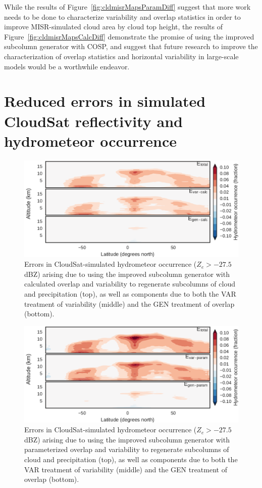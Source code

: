 While the results of Figure~\ref{fig:cldmisrMapsParamDiff} suggest that
more work needs to be done to characterize variability and overlap
statistics in order to improve MISR-simulated cloud area by cloud top
height, the results of Figure~\ref{fig:cldmisrMapsCalcDiff} demonstrate
the promise of using the improved subcolumn generator with COSP, and
suggest that future research to improve the characterization of overlap
statistics and horizontal variability in large-scale models would be a
worthwhile endeavor.

\section{Reduced errors in simulated CloudSat reflectivity and
hydrometeor occurrence}\label{sec:subgrid2Active}

\begin{figure}[htbp]
\centering
\includegraphics{graphics/subgrid2_hfba_zonal_gen-var-calc_diff.pdf}
\caption{\label{fig:hfbaZonalCalcDiff}Errors in CloudSat-simulated
hydrometeor occurrence (\(Z_e > -27.5\) dBZ) arising due to using the
improved subcolumn generator with calculated overlap and variability to
regenerate subcolumns of cloud and precipitation (top), as well as
components due to both the VAR treatment of variability (middle) and the
GEN treatment of overlap (bottom).}\label{fig:hfbaZonalCalcDiff}
\end{figure}

\begin{figure}[htbp]
\centering
\includegraphics{graphics/subgrid2_hfba_zonal_gen-var-param_diff.pdf}
\caption{\label{fig:hfbaZonalParamDiff}Errors in CloudSat-simulated
hydrometeor occurrence (\(Z_e > -27.5\) dBZ) arising due to using the
improved subcolumn generator with parameterized overlap and variability
to regenerate subcolumns of cloud and precipitation (top), as well as
components due to both the VAR treatment of variability (middle) and the
GEN treatment of overlap (bottom).}\label{fig:hfbaZonalParamDiff}
\end{figure}

